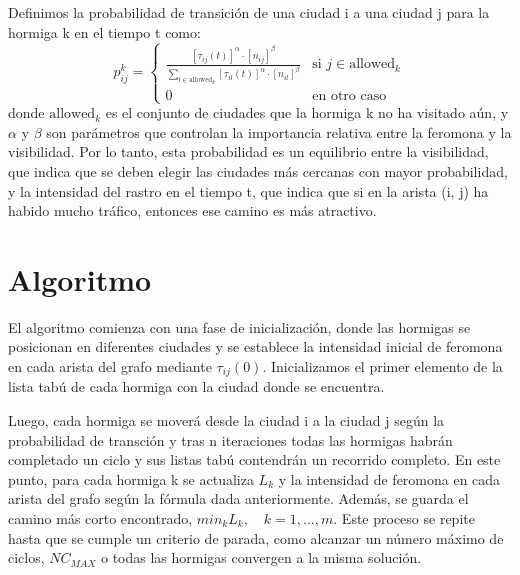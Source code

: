 \documentclass{article}
\begin{document}
Definimos la probabilidad de transición de una ciudad i a una ciudad j para la hormiga k en el tiempo t como:
\begin{equation}
    p_{ij}^k = \begin{cases}
    \frac{[\tau_{ij}(t)]^{\alpha} \cdot [n_{ij}]^{\beta}}{\sum_{l \in \text{allowed}_k} [\tau_{il}(t)]^{\alpha} \cdot [n_{il}]^{\beta}} & \text{si } j \in \text{allowed}_k\\
    0 & \text{en otro caso}
    \end{cases}
    \label{eq}
\end{equation}
donde $\text{allowed}_k$ es el conjunto de ciudades que la hormiga k no ha visitado aún, y $\alpha$ y $\beta$ son parámetros que controlan la
importancia relativa entre la feromona y la visibilidad.
Por lo tanto, esta probabilidad es un equilibrio entre la visibilidad, que indica que se deben elegir las ciudades más cercanas con mayor probabilidad,
y la intensidad del rastro en el tiempo t, que indica que si en la arista (i, j) ha habido mucho tráfico, entonces ese camino es más atractivo.

\section{Algoritmo}

El algoritmo comienza con una fase de inicialización, donde las hormigas se posicionan en diferentes ciudades y se establece la intensidad inicial de feromona en cada arista del grafo
mediante $\tau_{ij}(0)$. Inicializamos el primer elemento de la lista tabú de cada hormiga con la ciudad donde se encuentra.

Luego, cada hormiga se moverá desde la ciudad i a la ciudad j según la probabilidad de transción y tras n iteraciones todas las hormigas habrán completado un ciclo y sus listas tabú contendrán un recorrido completo.
En este punto, para cada hormiga k se actualiza $L_k$ y la intensidad de feromona en cada arista del grafo según la fórmula dada anteriormente.
Además, se guarda el camino más corto encontrado, $min_k L_k, \quad k = 1,...,m$.
Este proceso se repite hasta que se cumple un criterio de parada, como alcanzar un número máximo de ciclos, $NC_{MAX}$ o todas las hormigas convergen a la misma solución.
\end{document}
